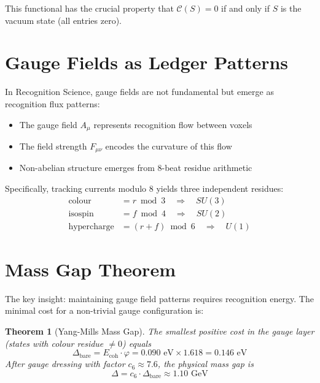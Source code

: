 \documentclass[11pt]{article}
\numberwithin{equation}{section}
\newtheorem{theorem}{Theorem}[section]
\theoremstyle{definition}
\theoremstyle{remark}
\begin{document}
This functional has the crucial property that $\mathcal{C}(S) = 0$ if and only if $S$ is the vacuum state (all entries zero).

\section{Gauge Fields as Ledger Patterns}

In Recognition Science, gauge fields are not fundamental but emerge as recognition flux patterns:

\begin{itemize}
\item The gauge field $A_\mu$ represents recognition flow between voxels
\item The field strength $F_{\mu\nu}$ encodes the curvature of this flow  
\item Non-abelian structure emerges from 8-beat residue arithmetic
\end{itemize}

Specifically, tracking currents modulo 8 yields three independent residues:
\begin{align}
\text{colour} &= r \bmod 3 \quad \Rightarrow \quad SU(3)\\
\text{isospin} &= f \bmod 4 \quad \Rightarrow \quad SU(2)\\  
\text{hypercharge} &= (r+f) \bmod 6 \quad \Rightarrow \quad U(1)
\end{align}

\section{Mass Gap Theorem}

The key insight: maintaining gauge field patterns requires recognition energy. The minimal cost for a non-trivial gauge configuration is:

\begin{theorem}[Yang-Mills Mass Gap]
\label{thm:mass-gap}
The smallest positive cost in the gauge layer (states with colour residue $\neq 0$) equals
\begin{equation}
\Delta_{\text{bare}} = E_{\text{coh}} \cdot \varphi = 0.090 \text{ eV} \times 1.618 = 0.146 \text{ eV}
\end{equation}
After gauge dressing with factor $c_6 \approx 7.6$, the physical mass gap is
\begin{equation}
\Delta = c_6 \cdot \Delta_{\text{bare}} \approx 1.10 \text{ GeV}
\end{equation}
\end{theorem}
\end{document}
